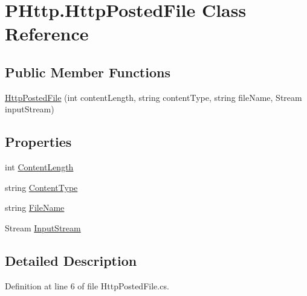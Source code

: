\hypertarget{class_p_http_1_1_http_posted_file}{}\section{P\+Http.\+Http\+Posted\+File Class Reference}
\label{class_p_http_1_1_http_posted_file}
\subsection*{Public Member Functions}
\begin{DoxyCompactItemize}
\item 
\hyperlink{class_p_http_1_1_http_posted_file_a81377359a071ee5808f7e99bb80d6a29}{Http\+Posted\+File} (int content\+Length, string content\+Type, string file\+Name, Stream input\+Stream)
\end{DoxyCompactItemize}
\subsection*{Properties}
\begin{DoxyCompactItemize}
\item 
int \hyperlink{class_p_http_1_1_http_posted_file_ad3e3b683b2e745613493026d1e9dec48}{Content\+Length}
\item 
string \hyperlink{class_p_http_1_1_http_posted_file_acaecc2dc2da7e87ac18aea37c819dd1f}{Content\+Type}
\item 
string \hyperlink{class_p_http_1_1_http_posted_file_aabc872b625388d4f29d6ebba84320a56}{File\+Name}
\item 
Stream \hyperlink{class_p_http_1_1_http_posted_file_aad78b086dfdb2386015369ad7f9ff70e}{Input\+Stream}
\end{DoxyCompactItemize}


\subsection{Detailed Description}


Definition at line 6 of file Http\+Posted\+File.\+cs.



